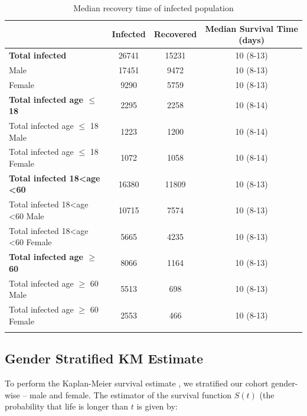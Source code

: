 \documentclass[letterpaper]{article} %
\begin{document}
	\begin{table}[h!]
		\centering
		\begin{tabular}{@{}lccc@{}}
			\toprule
			& Infected & Recovered & Median Survival Time (days) \\ \midrule
			\textbf{Total infected}                                & 26741    & 15231     & 10 (8-13)            \\
			Male                                                   & 17451    & 9472      & 10 (8-13)            \\
			Female                                                 & 9290     & 5759      & 10 (8-13)            \\\midrule
			\textbf{Total infected age  $\leq$ 18}             & 2295     & 2258      & 10 (8-14)            \\
			Total infected age $\leq$ 18 Male                 & 1223     & 1200      & 10 (8-14)            \\
			Total infected age $\leq$ 18 Female               & 1072     & 1058      & 10 (8-14)            \\\midrule
			\textbf{Total infected 18\textless{}age \textless{}60} & 16380    & 11809     & 10 (8-13)            \\
			Total infected 18\textless{}age \textless{}60 Male     & 10715    & 7574      & 10 (8-13)            \\
			Total infected 18\textless{}age \textless{}60 Female   & 5665     & 4235      & 10 (8-13)            \\\midrule
			\textbf{Total infected age  $\geq$ 60}          & 8066     & 1164      & 10 (8-13)            \\
			Total infected age $\geq$ 60 Male              & 5513     & 698       & 10 (8-13)            \\
			Total infected age $\geq$ 60 Female            & 2553     & 466       & 10 (8-13)            \\ \bottomrule
			
			\label{t1}
		\end{tabular}
		\caption{ Median recovery time of infected population}
		\label{table:t1}
	\end{table}
	
	\subsection{Gender Stratified KM Estimate}
	To perform the Kaplan-Meier survival estimate \cite{kaplan1958nonparametric}, we stratified our cohort gender-wise -- male and female. 
	The estimator of the survival function ${\displaystyle S(t)}$ (the probability that life is longer than ${\displaystyle t}$ is given by:
	
\end{document}
